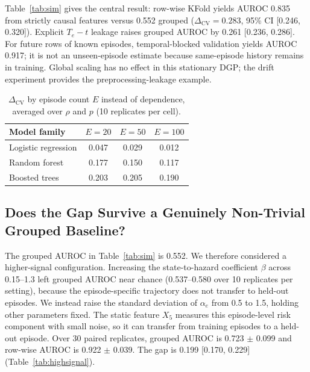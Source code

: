 \documentclass[runningheads]{llncs}
\newcommand{\1}{\mathbf{1}}
\newcommand{\DeltaCV}{\Delta_{\text{CV}}}
\begin{document}
Table~\ref{tab:sim} gives the central result: row-wise KFold yields AUROC 0.835 from strictly causal features versus 0.552 grouped ($\DeltaCV=0.283$, 95\% CI [0.246, 0.320]). Explicit $T_e-t$ leakage raises grouped AUROC by 0.261 [0.236, 0.286]. For future rows of known episodes, temporal-blocked validation yields AUROC 0.917; it is not an unseen-episode estimate because same-episode history remains in training. Global scaling has no effect in this stationary DGP; the drift experiment provides the preprocessing-leakage example.

\begin{table}[t]
\centering
\caption{$\DeltaCV$ by episode count $E$ instead of dependence, averaged over $\rho$ and $p$ (10 replicates per cell).}\label{tab:grid-episodes}
\small
\begin{tabular}{@{}lccc@{}}
\toprule
Model family & $E = 20$ & $E = 50$ & $E = 100$ \\
\midrule
Logistic regression & 0.047 & 0.029 & 0.012 \\
Random forest & 0.177 & 0.150 & 0.117 \\
Boosted trees & 0.203 & 0.205 & 0.190 \\
\bottomrule
\end{tabular}
\end{table}

\subsection{Does the Gap Survive a Genuinely Non-Trivial Grouped Baseline?}\label{sec:highsignal}

The grouped AUROC in Table~\ref{tab:sim} is 0.552. We therefore considered a higher-signal configuration. Increasing the state-to-hazard coefficient $\beta$ across 0.15--1.3 left grouped AUROC near chance (0.537--0.580 over 10 replicates per setting), because the episode-specific trajectory does not transfer to held-out episodes. We instead raise the standard deviation of $\alpha_e$ from 0.5 to 1.5, holding other parameters fixed. The static feature $X_5$ measures this episode-level risk component with small noise, so it can transfer from training episodes to a held-out episode. Over 30 paired replicates, grouped AUROC is 0.723 $\pm$ 0.099 and row-wise AUROC is 0.922 $\pm$ 0.039. The gap is 0.199 [0.170, 0.229] (Table~\ref{tab:highsignal}).
\end{document}
